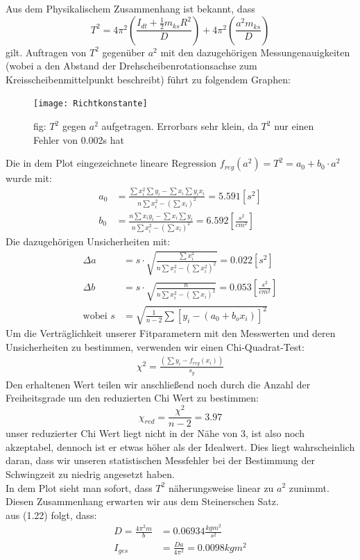 \documentclass[11pt,a4paper]{article}
\begin{document}
	Aus dem Physikalischem Zusammenhang ist bekannt, dass
	\begin{equation}
		T^2 = 4 \pi^2 \left(\frac{I_{dt}+ \frac{1}{2} m_{ks}R^2}{D}\right) +4\pi^2 \left(\frac{a^2m_{ks}}{D}\right)
	\end{equation}
	gilt.
	Auftragen von $T^2$ gegenüber $a^2$ mit den dazugehörigen Messungenauigkeiten (wobei a den Abstand der Drehscheibenrotationsachse zum Kreisscheibenmittelpunkt beschreibt) führt zu folgendem Graphen:\\
	\begin{figure}[H]
	\texttt{[image: Richtkonstante]}
	\caption[]{fig: $T^2$ gegen $a^2$ aufgetragen. Errorbars sehr klein, da $T^2$ nur einen Fehler von 0.002s hat}
	\end{figure}
	Die in dem Plot eingezeichnete lineare Regression $f_{reg}(a^2)=T^2=a_0 + b_0 \cdot a^2$ wurde mit:
	\begin{align}
	a_0 &= \frac{\sum x_i^2 \sum y_i -\sum x_i \sum y_i x_i}{n\sum x_i^2 -(\sum x_i)^2}=5.591[s^2]\\
	b_0 &= \frac{n \sum x_i y_i - \sum x_i \sum y_i}{n \sum x_i^2 - (\sum x_i)^2}=6.592 [\frac{s^2}{cm^2}]
	\end{align}
	Die dazugehörigen Unsicherheiten mit:
	\begin{align}
	\Delta a &= s \cdot \sqrt{\frac{\sum x_i^2}{n \sum x_i^2 - (\sum x_i^2)^2}}=0.022[s^2]\\
	\Delta b &= s \cdot \sqrt{\frac{n}{n \sum x_i^2 - (\sum x_i)^2}}=0.053[\frac{s^2}{cm^2}]\\
	 \text{wobei  } s&=\sqrt{\frac{1}{n-2} \sum [y_i -( a_0 + b_o x_i)]^2}
	\end{align}
	Um die Verträglichkeit unserer Fitparametern mit den Messwerten und deren Unsicherheiten zu bestimmen,
	verwenden wir einen Chi-Quadrat-Test:
	\begin{align}
	\chi ^2 = \frac{(\sum y_i - f_{reg}(x_i))}{s_y}
	\end{align}
	Den erhaltenen Wert teilen wir anschließend noch durch die Anzahl der Freiheitsgrade um den reduzierten Chi Wert zu bestimmen:
	$$\chi _{red} = \frac{\chi ^2 }{n-2} =3.97$$
	unser reduzierter Chi Wert liegt nicht in der Nähe von 3, ist also noch akzeptabel, dennoch ist er etwas höher als der Idealwert.
	Dies liegt wahrscheinlich daran, dass wir unseren statistischen Messfehler bei der Bestimmung der Schwingzeit zu niedrig angesetzt haben.\vspace{2cm}\\
	In dem Plot sieht man sofort, dass $T^2$ näherungsweise linear zu $a^2$ zunimmt. Diesen Zusammenhang erwarten wir aus dem Steinerschen Satz.
	\\
	aus (1.22) folgt, dass:
	\begin{align}
	D=\frac{4 \pi ^2 m}{b}&=0.06934 \frac{kg m^2}{s^2}\\
	I_{ges}&= \frac{Da}{4 \pi^2} =0.0098 kg m^2
	\end{align}
	
\end{document}
